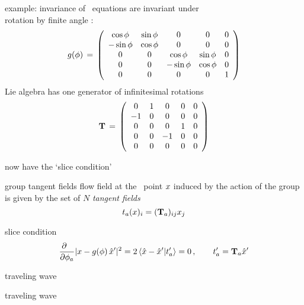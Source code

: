 \begin{frame}{example:  invariance of \cLe}
\cLe\ equations are invariant under
\\
 rotation by finite angle \gSpace:
\[
\LieEl(\gSpace) \,=\,  \left(\barr{ccccc}
  \cos \gSpace  & \sin \gSpace  & 0 & 0 & 0 \\
 -\sin \gSpace  & \cos \gSpace  & 0 & 0 & 0 \\
 0 & 0 &  \cos \gSpace & \sin \gSpace   & 0 \\
 0 & 0 & -\sin \gSpace & \cos \gSpace   & 0 \\
 0 & 0 & 0             & 0              & 1
    \earr\right)
\] %
 Lie algebra has one generator
of infinitesimal rotations
\[
 \Lg \,=\,   \left(\barr{ccccc}
    0  &  1 & 0  &  0 & 0  \\
   -1  &  0 & 0  &  0 & 0 \\
    0  &  0 & 0  &  1 & 0  \\
    0  &  0 &-1  &  0 & 0 \\
    0  &  0 & 0  &  0 & 0
    \earr\right)
\] %
\end{frame}

\begin{frame}{now have the `slice condition'}
\begin{block}{group tangent fields}
flow field at the \statesp\
point $\ssp$ induced by the action of the group is given by
the set of $N$ \emph{tangent fields}
\[
\groupTan_a(\ssp)_{i}= (\Lg_a){}_{ij} \ssp_j
\] %
\end{block}
\bigskip
\begin{block}{slice condition}
\[ %
\frac{\partial ~~}{\partial \gSpace_a} |\ssp - \LieEl(\gSpace)\,\slicep|^2
   =
2\, \braket{\sspRed - \slicep}{\sliceTan{a}}
   = 0
    \,,\qquad
	  \sliceTan{a} = \Lg_a \slicep
\] %
\end{block}
\end{frame}

\begin{frame}{traveling wave}
\end{frame}


\begin{frame}{traveling wave}
\end{frame}

